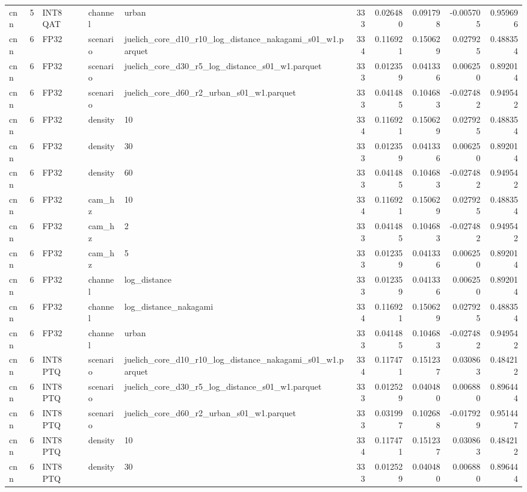 \begin{tabular}{lrlllrrrrr}
cnn & 5 & INT8 QAT & channel & urban & 333 & 0.026480 & 0.091798 & -0.005705 & 0.959696 \\
cnn & 6 & FP32 & scenario & juelich\_core\_d10\_r10\_log\_distance\_nakagami\_s01\_w1.parquet & 334 & 0.116921 & 0.150629 & 0.027925 & 0.488354 \\
cnn & 6 & FP32 & scenario & juelich\_core\_d30\_r5\_log\_distance\_s01\_w1.parquet & 333 & 0.012359 & 0.041336 & 0.006250 & 0.892014 \\
cnn & 6 & FP32 & scenario & juelich\_core\_d60\_r2\_urban\_s01\_w1.parquet & 333 & 0.041485 & 0.104683 & -0.027482 & 0.949542 \\
cnn & 6 & FP32 & density & 10 & 334 & 0.116921 & 0.150629 & 0.027925 & 0.488354 \\
cnn & 6 & FP32 & density & 30 & 333 & 0.012359 & 0.041336 & 0.006250 & 0.892014 \\
cnn & 6 & FP32 & density & 60 & 333 & 0.041485 & 0.104683 & -0.027482 & 0.949542 \\
cnn & 6 & FP32 & cam\_hz & 10 & 334 & 0.116921 & 0.150629 & 0.027925 & 0.488354 \\
cnn & 6 & FP32 & cam\_hz & 2 & 333 & 0.041485 & 0.104683 & -0.027482 & 0.949542 \\
cnn & 6 & FP32 & cam\_hz & 5 & 333 & 0.012359 & 0.041336 & 0.006250 & 0.892014 \\
cnn & 6 & FP32 & channel & log\_distance & 333 & 0.012359 & 0.041336 & 0.006250 & 0.892014 \\
cnn & 6 & FP32 & channel & log\_distance\_nakagami & 334 & 0.116921 & 0.150629 & 0.027925 & 0.488354 \\
cnn & 6 & FP32 & channel & urban & 333 & 0.041485 & 0.104683 & -0.027482 & 0.949542 \\
cnn & 6 & INT8 PTQ & scenario & juelich\_core\_d10\_r10\_log\_distance\_nakagami\_s01\_w1.parquet & 334 & 0.117471 & 0.151237 & 0.030863 & 0.484212 \\
cnn & 6 & INT8 PTQ & scenario & juelich\_core\_d30\_r5\_log\_distance\_s01\_w1.parquet & 333 & 0.012529 & 0.040480 & 0.006880 & 0.896444 \\
cnn & 6 & INT8 PTQ & scenario & juelich\_core\_d60\_r2\_urban\_s01\_w1.parquet & 333 & 0.031997 & 0.102688 & -0.017929 & 0.951447 \\
cnn & 6 & INT8 PTQ & density & 10 & 334 & 0.117471 & 0.151237 & 0.030863 & 0.484212 \\
cnn & 6 & INT8 PTQ & density & 30 & 333 & 0.012529 & 0.040480 & 0.006880 & 0.896444 \\

\end{tabular}
